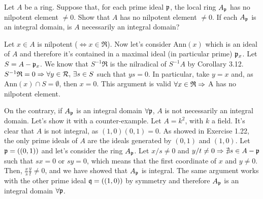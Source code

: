 \begin{ex}
	Let $A$ be a ring. Suppose that, for each prime ideal $\mathfrak{p}$, the local ring $A_{\mathfrak{p}}$ has no nilpotent element $\neq 0$. Show that $A$ has no nilpotent element $\neq 0$. If each $A_{\mathfrak{p}}$ is an integral domain, is $A$ necessarily an integral domain?
\end{ex}

\begin{sol}
	Let $x \in A$ is nilpotent ($\iff x \in \mathfrak{R}$). Now let's consider $\text{Ann}(x)$ which is an ideal of $A$ and therefore it's contained in a maximal ideal (in particular prime) $\mathfrak{p}_x$. Let $S = A - \mathfrak{p}_x$. We know that $S^{-1} \mathfrak{R}$ is the nilradical of $S^{-1}A$ by Corollary 3.12. $S^{-1} \mathfrak{R} = 0 \Rightarrow \forall y \in \mathcal{R}, \, \exists s \in S$ such that $ys = 0$. In particular, take $y = x$ and, as $\text{Ann}(x) \cap S = \emptyset$, then $x = 0$. This argument is valid $\forall x \in \mathfrak{R} \Rightarrow$ A has no nilpotent element. 

	On the contrary, if $A_{\mathfrak{p}}$ is an integral domain $\forall \mathfrak{p}$, $A$ is not necessarily an integral domain. Let's show it with a counter-example. Let $A = k^2$, with $k$ a field. It's clear that $A$ is not integral, as $(1,0)(0,1) = 0$. As showed in Exercise 1.22, the only prime ideals of $A$ are the ideals generated by $(0,1)$ and $(1,0)$. Let $\mathfrak{p} = ((0,1))$ and let's consider the ring $A_{\mathfrak{p}}$. Let $x/s \neq 0$ and $y/t \neq 0 \Rightarrow \nexists s \in A - \mathfrak{p}$ such that $sx = 0$ or $sy = 0$, which means that the first coordinate of $x$ and $y \neq 0$. Then, $\frac{x}{s}\frac{y}{t} \neq 0$, and we have showed that $A_{\mathfrak{p}}$ is integral. The same argument works with the other prime ideal $\mathfrak{q} = ((1,0))$ by symmetry and therefore $A_{\mathfrak{p}}$ is an integral domain $\forall \mathfrak{p}$.
\end{sol}
